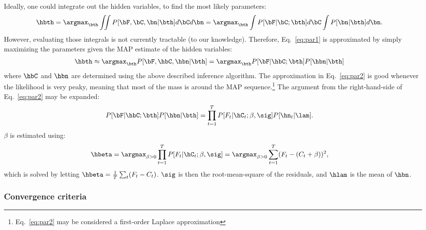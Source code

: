 Ideally, one could integrate out the hidden variables, to find the most likely parameters:
\begin{align} \label{eq:par1}
\hbth &= \argmax_{\bth} \iint P[\bF, \bC, \bn | \bth] d\bC d\bn = \argmax_{\bth} \int P[\bF | \bC; \bth] d\bC \int P[\bn | \bth] d\bn.
\end{align}
However, evaluating those integrals is not currently tractable (to our knowledge).
Therefore, Eq.~\eqref{eq:par1} is approximated by simply maximizing the parameters given the MAP estimate of the hidden variables:
\begin{align} \label{eq:par2}
\hbth &\approx \argmax_{\bth} P[\bF, \hbC, \hbn | \bth] = \argmax_{\bth} P[\bF| \hbC; \bth] P[\hbn | \bth]
\end{align}
\noindent where $\hbC$ and $\hbn$ are determined using the above described inference algorithm. The approximation in Eq.~\eqref{eq:par2} is good whenever the likelihood is very peaky, meaning that most of the mass is around the MAP sequence.\footnote{Eq.~\eqref{eq:par2} may be considered a first-order Laplace approximation}   The argument from the right-hand-side of Eq.~\eqref{eq:par2} may be expanded: 
\begin{align} \label{eq:par3}
P[\bF| \hbC; \bth] P[\hbn | \bth] &= \prod_{t=1}^T P[F_t | \hC_t; \beta,\sig]  P[\hn_t | \lam].
\end{align}
\noindent $\beta$ is estimated using:
\begin{align} \label{eq:beta}
	\hbeta &= \argmax_{\beta >0} \prod_{t=1}^T P[F_t | \hC_t; \beta,\sig] = \argmax_{\beta>0} \sum_{t=1}^T (F_t - (C_t + \beta))^2,
\end{align}
\noindent which is solved by letting $\hbeta=\frac{1}{T}\sum_t (F_t-C_t)$.  $\sig$ is then the root-mean-square of the residuals, and $\hlam$ is the mean of $\hbn$. 

\subsubsection{Convergence criteria}

